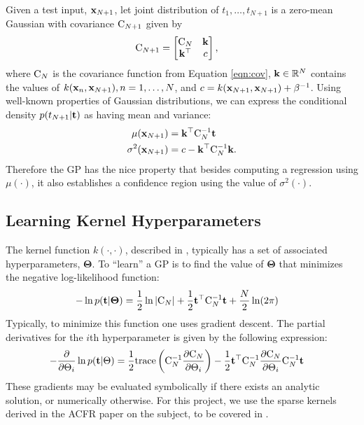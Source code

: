 Given a test input, ${\bf x}_{N+1}$, let joint distribution of $t_1, \dots, t_{N+1}$ is a
zero-mean Gaussian with covariance $\mathrm{C}_{N+1}$ given by
\begin{align*}
  \mathrm{C}_{N+1} &= \begin{bmatrix}
    \mathrm{C}_N & {\bf k} \\
    {\bf k}^\top & c \\
  \end{bmatrix},
\end{align*}
where $\mathrm{C}_N$ is the covariance function from Equation \ref{eqn:cov}, ${\bf k} \in
\mathbb{R}^N$ contains the values of $k({\bf x}_n, {\bf x}_{N+1}), n = 1,\dots,N$, and $c
= k({\bf x}_{N+1}, {\bf x}_{N+1}) + \beta^{-1}$.  Using well-known properties of Gaussian
distributions, we can express the conditional density $p(t_{N+1} | {\bf t})$ as having
mean and variance:
\begin{align*}
  \mu ({\bf x}_{N+1}) &= {\bf k}^\top \mathrm{C}_N^{-1} {\bf t} \notag \\
  \sigma^2({\bf x}_{N+1}) &= c - {\bf k}^\top \mathrm{C}_N^{-1} {\bf k}.
\end{align*}
Therefore the \ac{GP} has the nice property that besides computing a regression using
$\mu(\cdot)$, it also establishes a confidence region using the value of
$\sigma^2(\cdot)$.

\subsection{Learning Kernel Hyperparameters}
\label{sub:learningkernelhyperparameters}

The kernel function $k(\cdot, \cdot)$, described in ,
typically has a set of associated hyperparameters, ${\boldsymbol \Theta}$.
To ``learn'' a \ac{GP} is to find the value of ${\boldsymbol \Theta}$ that
minimizes the negative log-likelihood function:
\begin{align*}
  -\ln p({\bf t} | {\boldsymbol \Theta}) &= \frac{1}{2} \ln | \mathrm{C}_N | + \frac{1}{2}
  {\bf t}^\top \mathrm{C}_N^{-1} {\bf t} + \frac{N}{2} \ln (2\pi)
\end{align*}
Typically, to minimize this function one uses gradient descent.  The partial derivatives
for the $i$th hyperparameter is given by the following expression:
\begin{align}
  \label{eqn:learn}
  -\frac{\partial}{\partial {\Theta}_i} \ln p({\bf t} | { \Theta})
  &= \frac{1}{2} \text{trace} \left(\mathrm{C}_{N}^{-1} \frac{\partial \mathrm{C}_N}{\partial
      { \Theta}_i}\right) - \frac{1}{2} {\bf t}^\top \mathrm{C}_N^{-1}
  \frac{\partial \mathrm{C}_N}{\partial { \Theta}_i} \mathrm{C}_N^{-1} {\bf t}
\end{align}
These gradients may be evaluated symbolically if there exists an analytic solution, or
numerically otherwise.  For this project, we use the sparse kernels derived in the
\ac{ACFR} paper on the subject, to be covered in .

